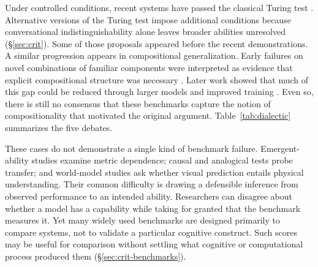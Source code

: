 \documentclass[acmsmall,screen,review,anonymous]{acmart}
\begin{document}
Under controlled conditions, recent systems have passed the classical Turing test \citep{10.1145/3715275.3732108, Jones2026}.
%
Alternative versions of the Turing test impose additional conditions because conversational indistinguishability alone leaves broader abilities unresolved (\S\ref{sec:crit}).
%
Some of those proposals appeared before the recent demonstrations.
%
A similar progression appears in compositional generalization.
%
Early failures on novel combinations of familiar components were interpreted as evidence that explicit compositional structure was necessary \citep{lake2018compskill, keysers2020measuringcompositionalgeneralizationcomprehensive, kim-linzen-2020-cogs}.
%
Later work showed that much of this gap could be reduced through larger models and improved training \citep{csordas2021devil}.
%
Even so, there is still no consensus that these benchmarks capture the notion of compositionality that motivated the original argument.
%
Table~\ref{tab:dialectic} summarizes the five debates.


These cases do not demonstrate a single kind of benchmark failure.
%
Emergent-ability studies examine metric dependence; causal and analogical tests probe transfer; and world-model studies ask whether visual prediction entails physical understanding.
%
Their common difficulty is drawing a defensible inference from observed performance to an intended ability.
%
Researchers can disagree about whether a model has a capability while taking for granted that the benchmark measures it.
%
Yet many widely used benchmarks are designed primarily to compare systems, not to validate a particular cognitive construct.
%
Such scores may be useful for comparison without settling what cognitive or computational process produced them (\S\ref{sec:crit-benchmarks}).
\end{document}
